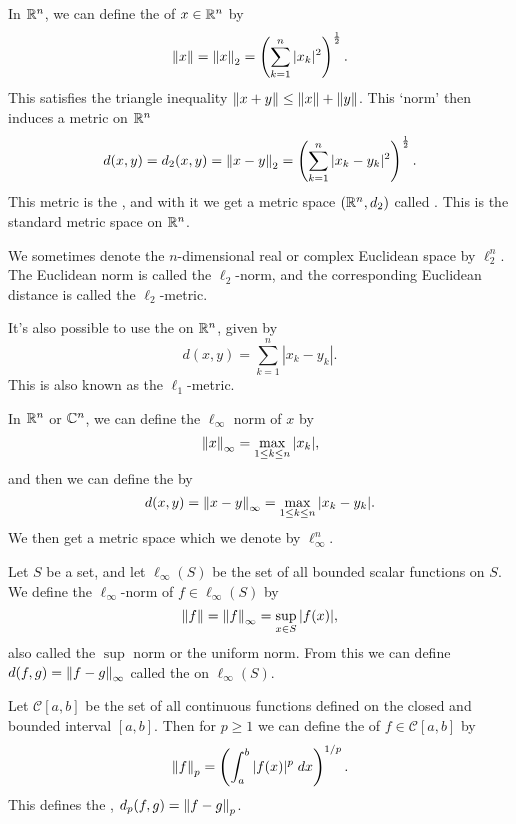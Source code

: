 \documentclass[a4paper]{scrartcl}
\begin{document}
\begin{example}
   In $\mathbb{R}^n$, we can define the 
   of $x \in \mathbb{R}^n$ by
   $$
    \norm{x} = \norm{x}_2 = \left(\sum_{k = 1}^n |x_k|^2\right)^{\frac{1}{2}}.
   $$
   This satisfies the triangle inequality $\norm{x + y} \leq \norm{x} + \norm{y}$. This `norm' then induces a metric on $\mathbb{R}^n$
   $$
    d(x, y) = d_2(x, y) = \norm{x - y}_2 = \left(\sum_{k = 1}^n |x_k - y_k|^2\right)^{\frac{1}{2}}.
   $$
   This metric is the , and with it we get a metric space $(\mathbb{R}^n, d_2)$ called . This is the standard metric space on $\mathbb{R}^n$.
\end{example}
\begin{remark}
    We sometimes denote the $n$-dimensional real or complex Euclidean space by $\ell_2^n$. The Euclidean norm is called the $\ell_2$-norm, and the corresponding Euclidean distance is called the $\ell_2$-metric.
\end{remark}

\begin{example}
It's also possible to use the  on $\mathbb{R}^n$, given by
$$
d(x, y) = \sum_{k = 1}^{n} |x_k - y_k|.
$$
This is also known as the $\ell_1$-metric.
\end{example}

\begin{example}
In $\mathbb{R}^n$ or $\mathbb{C}^n$, we can define the $\ell_{\infty}$ norm of $x$ by
$$
    \norm{x}_{\infty} = \max_{1 \leq k \leq n} |x_k|,
$$
and then we can define the  by
$$
d(x, y) = \norm{x - y}_{\infty} = \max_{1 \leq k \leq n} |x_k - y_k|.
$$
We then get a metric space which we denote by $\ell_{\infty}^n$.
\end{example}

\begin{example}
    Let $S$ be a set, and let $\ell_{\infty}(S)$ be the set of all bounded scalar functions on $S$. We define the $\ell_{\infty}$-norm of $f \in \ell_{\infty}(S)$ by
    $$
    \norm{f} = \norm{f}_{\infty} = \sup_{x \in S}|f(x)|,
    $$
    also called the $\sup$ norm or the uniform norm. From this we can define $d(f, g) = \norm{f - g}_{\infty}$ called the  on $\ell_{\infty}(S)$.
\end{example}

\begin{example}[$L_p$-Norm]
    Let $\mathcal{C}[a, b]$ be the set of all continuous functions defined on the closed and bounded interval $[a, b]$. Then for $p \geq 1$ we can define the  of $f \in \mathcal{C}[a, b]$ by
    $$
    \norm{f}_p = \left(\int_a^b |f(x)|^p \; d x\right)^{1/p}.
    $$
    This defines the , $d_p(f, g) = \norm{f - g}_{p}$.
\end{example}
\end{document}
